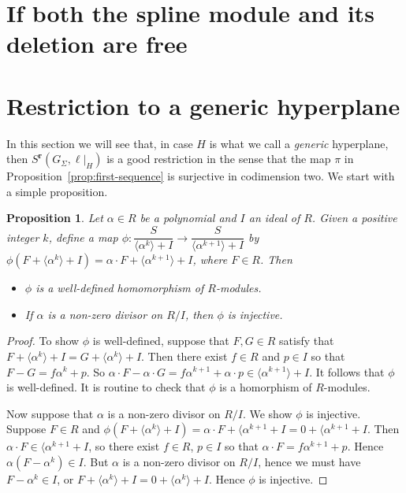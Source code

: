 \documentclass[11pt, reqno]{amsart}
\newcommand{\br}{\mathbf{r}}
\newtheorem{proposition}[theorem]{Proposition}
\theoremstyle{definition}
\theoremstyle{remark}
\numberwithin{equation}{section}
\begin{document}
\section{If both the spline module and its deletion are free}

\section{Restriction to a generic hyperplane}

In this section we will see that, in case $H$ is what we call a \textit{generic} hyperplane, then $S^{\br}(G_{\Sigma},\ell|_H)$ is a good restriction in the sense that the map $\pi$ in Proposition~\ref{prop:first-sequence} is surjective in codimension two.  We start with a simple proposition.

\begin{proposition}
Let $\alpha\in R$ be a polynomial and $I$ an ideal of $R$.  Given a positive integer $k$, define a map $\phi: \dfrac{S}{\langle \alpha^k\rangle+I}\to \dfrac{S}{\langle \alpha^{k+1}\rangle +I}$ by $\phi(F+\langle \alpha^k\rangle+I)=\alpha\cdot F+\langle \alpha^{k+1}\rangle+I$, where $F\in R$.  Then
\begin{itemize}
\item $\phi$ is a well-defined homomorphism of $R$-modules.
\item If $\alpha$ is a non-zero divisor on $R/I$, then $\phi$ is injective.
\end{itemize}
\end{proposition}
\begin{proof}
To show $\phi$ is well-defined, suppose that $F,G\in R$ satisfy that $F+\langle\alpha^k\rangle+I=G+\langle\alpha^k\rangle+I$.  Then there exist $f\in R$ and $p\in I$ so that $F-G=f\alpha^k+p$.  So $\alpha\cdot F-\alpha\cdot G=f\alpha^{k+1}+\alpha\cdot p\in \langle\alpha^{k+1}\rangle+I$.  It follows that $\phi$ is well-defined.  It is routine to check that $\phi$ is a homorphism of $R$-modules.

Now suppose that $\alpha$ is a non-zero divisor on $R/I$.  We show $\phi$ is injective.  Suppose $F\in R$ and $\phi(F+\langle \alpha^k\rangle+I)=\alpha\cdot F+\langle\alpha^{k+1}+I=0+\langle\alpha^{k+1}+I$.  Then $\alpha\cdot F\in \langle\alpha^{k+1}+I$, so there exist $f\in R$, $p\in I$ so that $\alpha\cdot F=f\alpha^{k+1}+p$.  Hence $\alpha(F-\alpha^k)\in I$.  But $\alpha$ is a non-zero divisor on $R/I$, hence we must have $F-\alpha^k\in I$, or $F+\langle \alpha^{k}\rangle + I=0+\langle \alpha^{k}\rangle + I$.  Hence $\phi$ is injective.
\end{proof}
\end{document}
